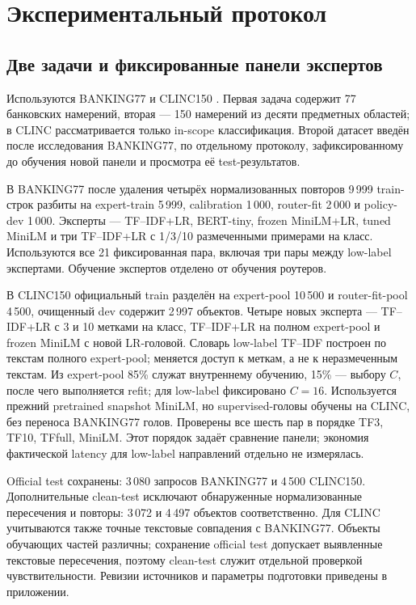\section{Экспериментальный протокол}
\label{sec:experiments_extended}
\subsection{Две задачи и фиксированные панели экспертов}
Используются BANKING77 \citep{review17} и CLINC150
\citep{larson2019clinc}. Первая задача содержит 77 банковских намерений,
вторая --- 150 намерений из десяти предметных областей; в CLINC
рассматривается только in-scope классификация. Второй датасет
введён после исследования BANKING77, по отдельному протоколу,
зафиксированному до обучения новой панели и просмотра её test-результатов.

В BANKING77 после удаления четырёх нормализованных повторов
9\,999 train-строк разбиты на expert-train 5\,999, calibration 1\,000,
router-fit 2\,000 и policy-dev 1\,000. Эксперты --- TF--IDF+LR,
BERT-tiny, frozen MiniLM+LR, tuned MiniLM и три TF--IDF+LR
с 1/3/10 размеченными примерами на класс. Используются все 21
фиксированная пара, включая три пары между low-label экспертами.
Обучение экспертов отделено от обучения роутеров.

В CLINC150 официальный train разделён на expert-pool 10\,500
и router-fit-pool 4\,500, очищенный dev содержит 2\,997 объектов.
Четыре новых эксперта --- TF--IDF+LR с 3 и 10 метками на класс,
TF--IDF+LR на полном expert-pool и frozen MiniLM с новой LR-головой.
Словарь low-label TF--IDF построен по текстам полного expert-pool;
меняется доступ к меткам, а не к неразмеченным текстам.
Из expert-pool 85\% служат внутреннему обучению, 15\% --- выбору $C$,
после чего выполняется refit; для low-label фиксировано $C=16$.
Используется прежний pretrained snapshot MiniLM, но supervised-головы
обучены на CLINC, без переноса BANKING77 голов. Проверены все шесть пар
в порядке TF3, TF10, TFfull, MiniLM. Этот порядок задаёт сравнение
панели; экономия фактической latency для low-label направлений
отдельно не измерялась.

Official test сохранены: 3\,080 запросов BANKING77 и 4\,500 CLINC150.
Дополнительные clean-test исключают обнаруженные нормализованные
пересечения и повторы: 3\,072 и 4\,497 объектов соответственно.
Для CLINC учитываются также точные текстовые совпадения с BANKING77.
Объекты обучающих частей различны; сохранение official test допускает
выявленные текстовые пересечения, поэтому clean-test служит отдельной
проверкой чувствительности. Ревизии источников и параметры подготовки
приведены в приложении.

